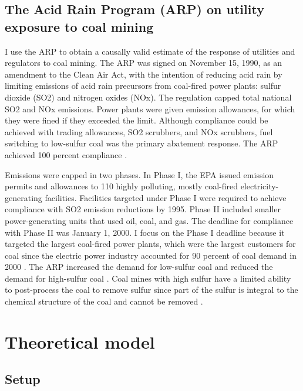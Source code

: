 \documentclass[12pt]{article}
\begin{document}
\subsection{The Acid Rain Program (ARP) on utility exposure to coal mining}

I use the ARP to obtain a causally valid estimate of the response of utilities and regulators to coal mining. The ARP was signed on November 15, 1990, as an amendment to the Clean Air Act, with the intention of reducing acid rain by limiting emissions of acid rain precursors from coal-fired power plants: sulfur dioxide (SO2) and nitrogen oxides (NOx). The regulation capped total national SO2 and NOx emissions. Power plants were given emission allowances, for which they were fined if they exceeded the limit. Although compliance could be achieved with trading allowances, SO2 scrubbers, and NOx scrubbers, fuel switching to low-sulfur coal was the primary abatement response. The ARP achieved 100 percent compliance \parencite{lattanzio2022clean}. 

Emissions were capped in two phases. In Phase I, the EPA issued emission permits and allowances to 110 highly polluting, mostly coal-fired electricity-generating facilities. Facilities targeted under Phase I were required to achieve compliance with SO2 emission reductions by 1995. Phase II included smaller power-generating units that used oil, coal, and gas. The deadline for compliance with Phase II was January 1, 2000. I focus on the Phase I deadline because it targeted the largest coal-fired power plants, which were the largest customers for coal since the electric power industry accounted for 90 percent of coal demand in 2000 \parencite{freme2000us}. The ARP increased the demand for low-sulfur coal and reduced the demand for high-sulfur coal \parencite{epaarpcoalemp, stratford2015coalprod}. Coal mines with high sulfur have a limited ability to post-process the coal to remove sulfur since part of the sulfur is integral to the chemical structure of the coal and cannot be removed \parencite{wheelock1984coal}.

\section{Theoretical model}\label{sec:model}
	
	\subsection{Setup}
	
\end{document}
